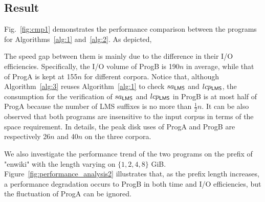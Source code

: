 \documentclass[10pt,journal,compsoc]{IEEEtran}
\begin{document}
\subsection{Result} \label{sec:experiments:result}

Fig.~\ref{fig:cmp1} demonstrates the performance comparison between the programs for Algorithms~\ref{alg:1} and~\ref{alg:2}. As depicted, 







The speed gap between them is mainly due to the difference in their I/O efficiencies. Specifically, the I/O volume of ProgB is 190$n$ in average, while that of ProgA is kept at 155$n$ for different corpora. Notice that, although Algorithm~\ref{alg:3} reuses Algorithm~\ref{alg:1} to check $sa_{\sf LMS}$ and $lcp_{\sf LMS}$, the consumption for the verification of $sa_{\sf LMS}$ and $lcp_{\sf LMS}$ in ProgB is at most half of ProgA because the number of LMS suffixes is no more than $\frac{1}{2}n$. It can be also observed that both programs are insensitive to the input corpus in terms of the space requirement. In details, the peak disk uses of ProgA and ProgB are respectively 26$n$ and 40$n$ on the three corpora.

We also investigate the performance trend of the two programs on the prefix of "enwiki" with the length varying on $\{1, 2, 4, 8\}$ GiB. Figure~\ref{fig:performance_analysis2} illustrates that, as the prefix length increases, a performance degradation occurs to ProgB in both time and I/O efficiencies, but the fluctuation of ProgA can be ignored.
\end{document}
